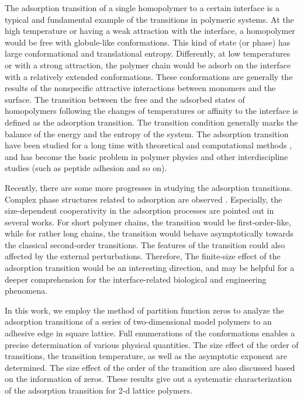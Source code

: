 \documentclass[aps,pre,twocolumn,showpacs,preprintnumbers,amsmath,amssymb]{revtex4-1}
\begin{document}
The adsorption transition of a single homopolymer to a certain interface
is a typical and fundamental example of the transitions in polymeric
systems\cite{LifshitzRMP78,deGennesBook79,ChengBook08,PhysRep,PCCP10,
JCP09,JCP09b,JCP10,PRL95,BinderBook95}.
At the high temperature or having a weak attraction with the interface,
a homopolymer would be free with globule-like conformations. This kind
of state (or phase) has large conformational and translational entropy.
Differently, at low temperatures or with a strong attraction, the polymer
chain would be adsorb on the interface with a relatively extended
conformations. These conformations are generally the results of the
nonspecific attractive interactions between monomers and the surface.
The transition between the free and the adsorbed states of homopolymers
following the changes of temperatures or affinity to the interface is
defined as the adsorption transition. The transition condition generally
marks the balance of the energy and the entropy of the system.
The adsorption transition have been studied for a long time with theoretical
and computational methods \cite{deGennesBook79,BinderBook95,CaparicaCPC09,
BinderBook10,PhysRep,PCCP10,JCP09,JCP09b,JCP10,PRL95},
and has become the basic problem in polymer
physics\cite{LifshitzRMP78,deGennesBook79,ChengBook08}
and other interdiscipline studies\cite{BiaoZi} (such as peptide adhesion and so on).

Recently, there are some more progresses in studying the adsorption
transitions. Complex phase structures related to adsorption are observed
\cite{PhysRep,PCCP10,JCP08}.
Especially, the size-dependent cooperativity in the adsorption processes
are pointed out in several works\cite{PCCP10,JCP09,JCP09b}. For short
polymer chains, the transition would be first-order-like, while for rather
long chains, the transition would behave asymptotically towards the classical
second-order transitions. The features of the transition could also affected
by the external perturbations\cite{Pull09}. Therefore,
The finite-size effect of the adsorption transition would be an interesting
direction, and may be helpful for a deeper comprehension for the
interface-related biological and engineering phenomena.

In this work, we employ the method of partition function zeros
to analyze the adsorption transitions of a series of two-dimensional
model polymers to an adhesive edge in square lattice. Full enumerations
of the conformations enables a precise determination of various
physical quantities. The size effect of the order of transitions,
the transition temperature, as well as the asymptotic exponent are
determined. The size effect of the order of the transition are also
discussed based on the information of zeros. These results give out a
systematic characterization of the adsorption transition for 2-d
lattice polymers.
\end{document}
